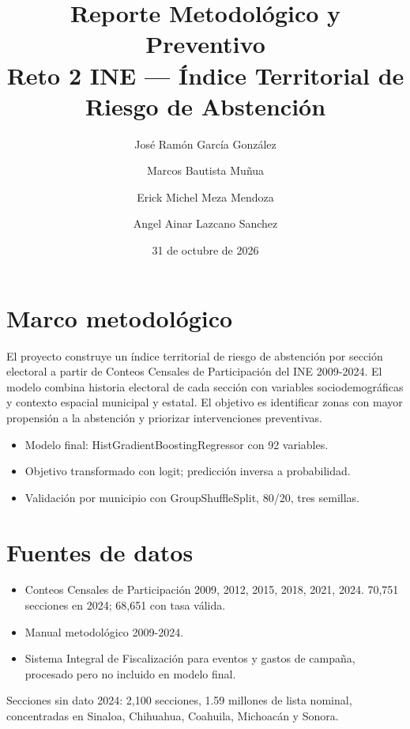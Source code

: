 \documentclass[12pt,a4paper]{article}
\title{Reporte Metodológico y Preventivo\\Reto 2 INE — Índice Territorial de Riesgo de Abstención}
\author{José Ramón García González \and Marcos Bautista Muñua \and Erick Michel Meza Mendoza \and Angel Ainar Lazcano Sanchez}
\date{31 de octubre de 2026}
\begin{document}
\maketitle

\section{Marco metodológico}
El proyecto construye un índice territorial de riesgo de abstención por sección electoral a partir de Conteos Censales de Participación del INE 2009-2024. El modelo combina historia electoral de cada sección con variables sociodemográficas y contexto espacial municipal y estatal. El objetivo es identificar zonas con mayor propensión a la abstención y priorizar intervenciones preventivas.

\begin{itemize}
\item Modelo final: HistGradientBoostingRegressor con 92 variables.
\item Objetivo transformado con logit; predicción inversa a probabilidad.
\item Validación por municipio con GroupShuffleSplit, 80/20, tres semillas.
\end{itemize}

\section{Fuentes de datos}
\begin{itemize}
\item Conteos Censales de Participación 2009, 2012, 2015, 2018, 2021, 2024. 70,751 secciones en 2024; 68,651 con tasa válida.
\item Manual metodológico 2009-2024.
\item Sistema Integral de Fiscalización para eventos y gastos de campaña, procesado pero no incluido en modelo final.
\end{itemize}

Secciones sin dato 2024: 2,100 secciones, 1.59 millones de lista nominal, concentradas en Sinaloa, Chihuahua, Coahuila, Michoacán y Sonora.
\end{document}
